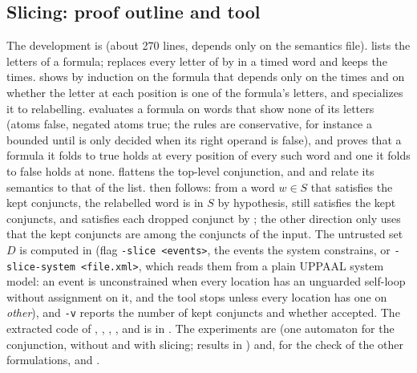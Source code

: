 \subsection{Slicing: proof outline and tool}\label{sec:slice-detail}
The development is  (about 270 lines, depends only on the semantics file).  lists the letters of a formula;  replaces every letter of  by  in a timed word and keeps the times.  shows by induction on the formula that  depends only on the times and on whether the letter at each position is one of the formula's letters, and  specializes it to relabelling.  evaluates a formula on words that show none of its letters (atoms false, negated atoms true; the rules are conservative, for instance a bounded until is only decided when its right operand is false), and  proves that a formula it folds to true holds at every position of every such word and one it folds to false holds at none.  flattens the top-level conjunction, and  and  relate its semantics to that of the list.  then follows: from a word $w\in S$ that satisfies the kept conjuncts, the relabelled word is in $S$ by hypothesis, still satisfies the kept conjuncts, and satisfies each dropped conjunct by ; the other direction only uses that the kept conjuncts are among the conjuncts of the input. The untrusted set $D$ is computed in  (flag \texttt{-slice <events>}, the events the system constrains, or \texttt{-slice-system <file.xml>}, which reads them from a plain UPPAAL system model: an event is unconstrained when every location has an unguarded self-loop without assignment on it, and the tool stops unless every location has one on \emph{other}), and \texttt{-v} reports the number of kept conjuncts and whether  accepted. The extracted code of , , , ,  and  is in . The experiments are  (one automaton for the conjunction, without and with slicing; results in ) and, for the check of the other formulations,  and .
